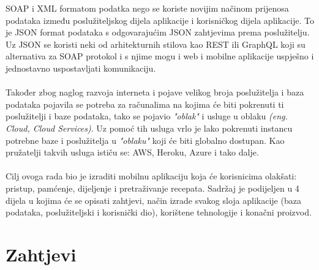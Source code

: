 \documentclass[times, utf8, zavrsni]{fer}
\begin{document}
SOAP i XML formatom podatka nego se koriste novijim načinom prijenosa
podataka između poslužiteljskog dijela aplikacije i korisničkog dijela aplikacije.
To je JSON format podataka s odgovarajućim JSON zahtjevima prema poslužitelju.
Uz JSON se koristi neki od arhitekturnih stilova kao REST ili GraphQL koji su alternativa
za SOAP protokol i s njime mogu i web i mobilne aplikacije uspješno i jednostavno uspostavljati komunikaciju.
\\\\
Također zbog naglog razvoja interneta i pojave velikog broja poslužitelja i baza podataka
pojavila se potreba za računalima na kojima će biti pokrenuti ti poslužitelji i
baze podataka, tako se pojavio \textit{"oblak"} i usluge u oblaku \textit{(eng. Cloud, Cloud Services)}.
Uz pomoć tih usluga vrlo je lako pokrenuti instancu potrebne baze i poslužitelja
u \textit{"oblaku"} koji će biti globalno dostupan. Kao pružatelji takvih usluga ističu se:
AWS, Heroku, Azure i tako dalje.
\\\\
Cilj ovoga rada bio je izraditi mobilnu aplikaciju koja će korisnicima olakšati: pristup,
pamćenje, dijeljenje i pretraživanje recepata. Sadržaj je podijeljen u 4 dijela u kojima
će se opisati zahtjevi, način izrade svakog sloja aplikacije (baza podataka,
poslužiteljski i korisnički dio), korištene tehnologije i konačni proizvod.

\chapter{Zahtjevi}
\end{document}
